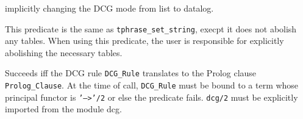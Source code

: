 \begin{description}
\noindent
implicitly changing the DCG mode from list to datalog.


    This predicate is the same as {\tt tphrase\_set\_string}, execpt
it does not abolish any tables.  When using this predicate, the
user is responsible for explicitly abolishing the necessary tables.

    Succeeds iff the DCG rule {\tt DCG\_Rule} translates to the Prolog
    clause {\tt Prolog\_Clause}.  At the time of call, {\tt DCG\_Rule}
    must be bound to a term whose principal functor is {\tt '-->'/2}
    or else the predicate fails.  {\tt dcg/2} must be explicitly
    imported from the module {\sf dcg}.

\end{description}


